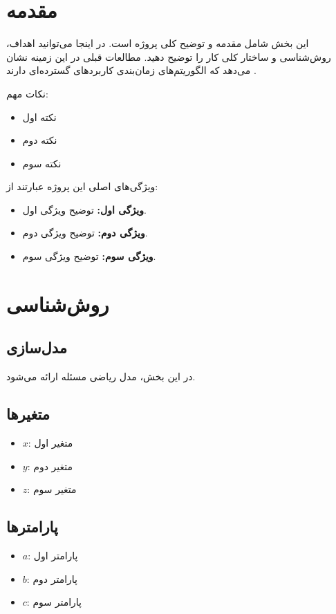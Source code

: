 % 

\section{مقدمه}
این بخش شامل مقدمه و توضیح کلی پروژه است. در اینجا می‌توانید اهداف، روش‌شناسی و ساختار کلی کار را توضیح دهید. مطالعات قبلی در این زمینه نشان می‌دهد که الگوریتم‌های زمان‌بندی کاربردهای گسترده‌ای دارند \cite{ref-1}.

\noindent
نکات مهم:
\begin{itemize}
    \item نکته اول
    \item نکته دوم
    \item نکته سوم
\end{itemize}

\noindent
ویژگی‌های اصلی این پروژه عبارتند از:
\begin{itemize}
    \item \textbf{ویژگی اول:} توضیح ویژگی اول.
    \item \textbf{ویژگی دوم:} توضیح ویژگی دوم.
    \item \textbf{ویژگی سوم:} توضیح ویژگی سوم.
\end{itemize}

\newpage

\section{روش‌شناسی}

\subsection{مدل‌سازی}
در این بخش، مدل ریاضی مسئله ارائه می‌شود.

\subsection*{متغیرها}
\begin{itemize}
    \item $ x $: متغیر اول
    \item $ y $: متغیر دوم
    \item $ z $: متغیر سوم
\end{itemize}

\subsection*{پارامترها}
\begin{itemize}
    \item $ a $: پارامتر اول
    \item $ b $: پارامتر دوم
    \item $ c $: پارامتر سوم
\end{itemize}

